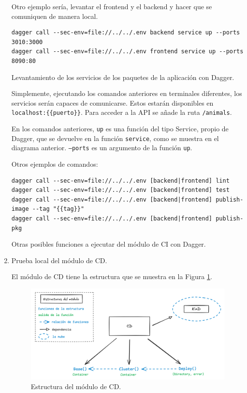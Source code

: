 \begin{enumerate}
    Otro ejemplo sería, levantar el frontend y el backend y hacer que se comuniquen de manera local.

\begin{listing}[!ht]
  \begin{verbatim}
dagger call --sec-env=file://../../.env backend service up --ports 3010:3000
dagger call --sec-env=file://../../.env frontend service up --ports 8090:80
\end{verbatim}
\caption{Levantamiento de los servicios de los paquetes de la aplicación con Dagger.}
\end{listing}

    Simplemente, ejecutando los comandos anteriores en terminales diferentes, los servicios serán capaces de comunicarse. Estos estarán disponibles en \texttt{localhost:\{\{puerto\}\}}. Para acceder a la API se añade la ruta \texttt{/animals}.

    En los comandos anteriores, \texttt{up} es una función del tipo Service, propio de Dagger, que se devuelve en la función \texttt{service}, como se muestra en el diagrama anterior. \texttt{--ports} es un argumento de la función \texttt{up}.

    Otros ejemplos de comandos:

\begin{listing}[!ht]
  \begin{verbatim}
dagger call --sec-env=file://../../.env [backend|frontend] lint
dagger call --sec-env=file://../../.env [backend|frontend] test
dagger call --sec-env=file://../../.env [backend|frontend] publish-image --tag "{{tag}}"
dagger call --sec-env=file://../../.env [backend|frontend] publish-pkg
\end{verbatim}
\caption{Otras posibles funciones a ejecutar del módulo de CI con Dagger.}
\end{listing}

  \item Prueba local del módulo de CD.

    El módulo de CD tiene la estructura que se muestra en la Figura \ref{fig:cd_schema}.

\begin{figure}
  \centerline{\includegraphics[width=13.5cm]{figuras/cd_schema}}
  \caption{Estructura del módulo de CD.}
  \label{fig:cd_schema}
\end{figure}


\end{enumerate}
